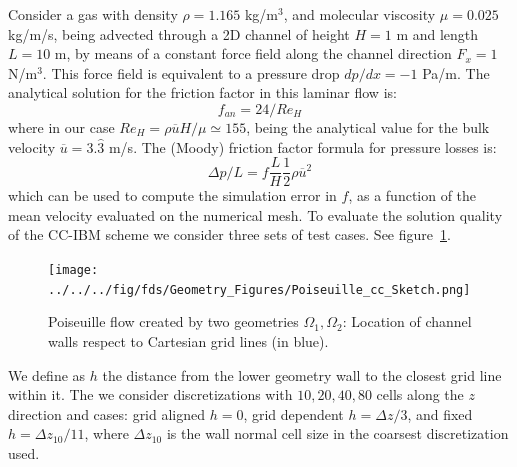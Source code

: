\documentclass[11pt]{book}
\begin{document}
\label{sec:poiseuille_cc}

Consider a gas with density $\rho=1.165$ kg/m$^3$, and molecular viscosity $\mu=0.025$ kg/m/s, being advected through a 2D channel of height $H=1$ m and length $L=10$ m, by means of a constant force field along the channel direction $F_x=1$ N/m$^3$. This force field is equivalent to a pressure drop $dp/dx=-1$ Pa/m. The analytical solution for the friction factor in this laminar flow is:
%
\begin{equation}
   f_{an} = 24/Re_H
\end{equation}
%
where in our case $Re_H= \rho \overline{u} H/ \mu \simeq 155$, being the analytical value for the bulk velocity $\overline{u}=3.\hat{3}$ m/s. The (Moody) friction factor formula for pressure losses is:
%
\begin{equation}
   \Delta p / L = f \frac{L}{H}  \frac{1}{2} \rho \overline{u}^2
\end{equation}
%
which can be used to compute the simulation error in $f$, as a function of the mean velocity evaluated on the numerical mesh. To evaluate the solution quality of the CC-IBM scheme we consider three sets of test cases. See figure~\ref{Fig:PoiseSketch}.
%
\begin{figure}[h]
      \centering
      \texttt{[image: ../../../fig/fds/Geometry\_Figures/Poiseuille\_cc\_Sketch.png]}
      \caption{Poiseuille flow created by two geometries $\Omega_1, \Omega_2$: Location of channel walls respect to Cartesian grid lines (in blue).}
	\label{Fig:PoiseSketch}
\end{figure}
%
We define as $h$ the distance from the lower geometry wall to the closest grid line within it. The we consider discretizations with ${10,20,40,80}$ cells along the $z$ direction and cases: grid aligned $h=0$, grid dependent $h=\Delta z /3$, and fixed $h=\Delta z_{10}/11$, where $\Delta z_{10}$ is the wall normal cell size in the coarsest discretization used.
\end{document}

